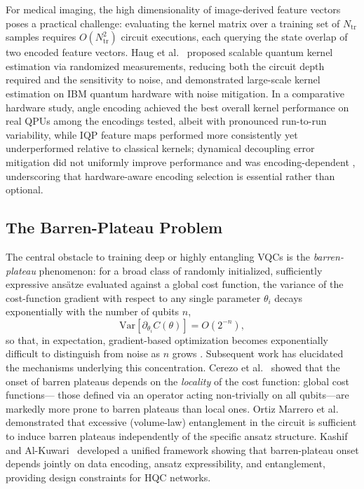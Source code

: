 \documentclass[11pt,a4paper]{article}
\begin{document}
For medical imaging, the high dimensionality of image-derived feature vectors
poses a practical challenge: evaluating the kernel matrix over a training set
of $N_{\text{tr}}$ samples requires $O(N_{\text{tr}}^2)$ circuit executions,
each querying the state overlap of two encoded feature vectors.  Haug et
al.~\cite{haug2021} proposed scalable quantum kernel estimation via
randomized measurements, reducing both the circuit depth required and the
sensitivity to noise, and demonstrated large-scale kernel estimation on IBM
quantum hardware with noise mitigation.  In a comparative hardware study,
angle encoding achieved the best overall kernel performance on real QPUs
among the encodings tested, albeit with pronounced run-to-run variability,
while IQP feature maps performed more consistently yet underperformed
relative to classical kernels; dynamical decoupling error mitigation did not
uniformly improve performance and was encoding-dependent
\cite{qkernel2022}, underscoring that hardware-aware encoding selection is
essential rather than optional.

\subsection{The Barren-Plateau Problem}
\label{sec:barren}

The central obstacle to training deep or highly entangling VQCs is the
\emph{barren-plateau} phenomenon: for a broad class of randomly initialized,
sufficiently expressive ansätze evaluated against a global cost function, the
variance of the cost-function gradient with respect to any single parameter
$\theta_i$ decays exponentially with the number of qubits $n$,
\begin{equation}
  \mathrm{Var}\!\left[\partial_{\theta_i} C(\theta)\right]
  = O\!\left(2^{-n}\right),
  \label{eq:barren}
\end{equation}
so that, in expectation, gradient-based optimization becomes exponentially
difficult to distinguish from noise as $n$ grows \cite{mcclean2018}.
Subsequent work has elucidated the mechanisms underlying this concentration.
Cerezo et al.~\cite{cerezo2021} showed that the onset of barren plateaus
depends on the \emph{locality} of the cost function: global cost functions---
those defined via an operator acting non-trivially on all qubits---are markedly
more prone to barren plateaus than local ones.  Ortiz Marrero et
al.~\cite{marrero2021} demonstrated that excessive (volume-law) entanglement in
the circuit is sufficient to induce barren plateaus independently of the
specific ansatz structure.  Kashif and Al-Kuwari~\cite{kashif2023} developed a
unified framework showing that barren-plateau onset depends jointly on data
encoding, ansatz expressibility, and entanglement, providing design constraints
for HQC networks.
\end{document}
